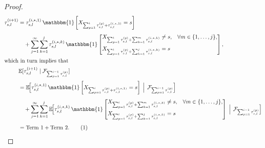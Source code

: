 \documentclass[twoside,11pt]{article}
\newcommand{\pow}[1]{^{(#1)}}%
\numberwithin{equation}{section}
\newcommand{\lb}{\left[}
\newcommand{\rb}{\right]}
\newcommand{\Fcal}{\mathcal{F}}
\newcommand\numberthis{\addtocounter{equation}{1}\tag{\theequation}}
\newcommand{\expec}{\mathbb{E}}
\newcommand{\indicator}{\mathbbm{1}}
\begin{document}
\begin{proof}
\begin{align*}
    \tau_{s,l}\pow{i+1}
    &= \tau_{s,l}\pow{i,\star,1}\,
       \indicator\lb
         X_{\sum_{p=1}^i \tau_{s,l}\pow{p}+ \tau_{s,l}\pow{i,\star,1}} = s
       \rb \\[4pt]
    &\quad
      + \sum_{j=1}^\infty \sum_{k=1}^j \tau_{s,l}\pow{i,\star,k}\,
        \indicator\lb
          \begin{aligned}[c]
            &X_{\sum_{p=1}^i \tau_{s,l}\pow{p}
                + \sum_{k=1}^{m}\tau_{s,l}\pow{i,\star,k}} \neq s,
                &&\forall m \in \{1,\ldots,j\},\\
            &X_{\sum_{p=1}^i \tau_{s,l}\pow{p}
                + \sum_{k=1}^{j}\tau_{s,l}\pow{i,\star,k}} = s
          \end{aligned}
        \rb,\\
\intertext{which in turn implies that}
    &\expec[\tau_{s,l}\pow{i+1}\mid \Fcal_{\sum_{p=1}^{i-1}\tau_{s,l}\pow{p}}] \\[2pt]
    &=
      \expec\!\Bigl[
        \tau_{s,l}\pow{i,\star,1}\,
        \indicator\lb
          X_{\sum_{p=1}^i \tau_{s,l}\pow{p}+ \tau_{s,l}\pow{i,\star,1}} = s
        \rb
        \,\Bigm|\,
        \Fcal_{\sum_{p=1}^{i-1}\tau_{s,l}\pow{p}}
      \Bigr] \\[4pt]
    &\quad
      + \sum_{j=1}^\infty \sum_{k=1}^j
        \expec\!\Bigl[
          \tau_{s,l}\pow{i,\star,k}\,
          \indicator\lb
            \begin{aligned}[c]
              &X_{\sum_{p=1}^i \tau_{s,l}\pow{p}
                  + \sum_{k=1}^{m}\tau_{s,l}\pow{i,\star,k}} \neq s,
                  &&\forall m \in \{1,\ldots,j\},\\
              &X_{\sum_{p=1}^i \tau_{s,l}\pow{p}
                  + \sum_{k=1}^j \tau_{s,l}\pow{i,\star,k}} = s
            \end{aligned}
          \rb
          \,\Bigm|\,
          \Fcal_{\sum_{p=1}^{i-1}\tau_{s,l}\pow{p}}
        \Bigr] \\[4pt]
    &= \text{Term 1} + \text{Term 2}.
    \numberthis \label{eq:ret-t-markeq4}
\end{align*}


\end{proof}
\end{document}
